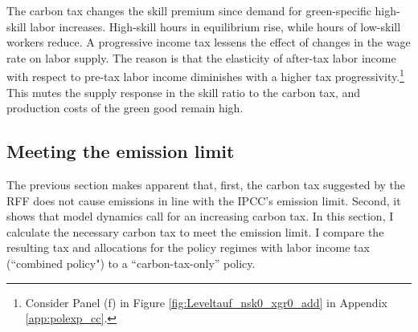The carbon tax changes the skill premium since demand for green-specific high-skill labor increases. High-skill hours in equilibrium rise, while hours of low-skill workers reduce.  A progressive income tax lessens the effect of changes in the wage rate on labor supply. The reason is that the elasticity of after-tax labor income with respect to pre-tax labor income diminishes with a higher tax progressivity.\footnote{ Consider Panel (f) in Figure \ref{fig:Leveltauf_nsk0_xgr0_add} in Appendix \ref{app:polexp_cc}.} This mutes the supply response in the skill ratio to the carbon tax, and production costs of the green good remain high.


\subsection{Meeting the emission limit}\label{subsec:meetlim}

The previous section makes apparent that, first, the carbon tax suggested by the RFF does not cause emissions in line with the IPCC's emission limit.  Second, it shows that model dynamics call for an increasing carbon tax. In this section, I calculate the necessary carbon tax to meet the emission limit. I compare the resulting tax and allocations for the policy regimes with labor income tax (``combined policy") to a ``carbon-tax-only'' policy.


